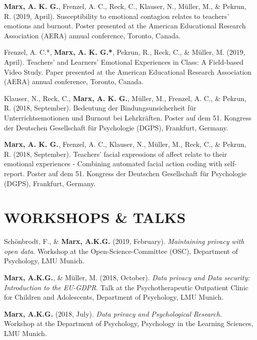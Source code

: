 \documentclass[letterpaper]{article}
\renewenvironment{itemize}{ %
  \begin{list}{}{ %
    \setlength{\leftmargin}{2.5em} %
  }
}{
  \end{list}
}
\begin{document}
\begin{itemize}
\item {\bf Marx, A. K. G.}, Frenzel, A. C., Reck, C., Klauser, N., Müller, M., \& Pekrun, R. (2019, April). Susceptibility to emotional contagion relates to teachers' emotions and burnout. Poster presented at the American Educational Research Association (AERA) annual conference, Toronto, Canada.
\item Frenzel, A. C.*, {\bf Marx, A. K. G.*}, Pekrun, R., Reck, C., \& Müller, M. (2019, April). Teachers’ and Learners’ Emotional Experiences in Class: A Field-based Video Study. Paper presented at the American Educational Research Association (AERA) annual conference, Toronto, Canada.
\item Klauser, N., Reck, C., {\bf Marx, A. K. G.}, Müller, M., Frenzel, A. C., \& Pekrun, R. (2018, September). Bedeutung der Bindungsunsicherheit für Unterrichtsemotionen und Burnout bei Lehrkräften. Poster auf dem 51. Kongress der Deutschen Gesellschaft für Psychologie (DGPS), Frankfurt, Germany.
\item {\bf Marx, A. K. G.}, Frenzel, A. C., Klauser, N., Müller, M., Reck, C., \& Pekrun, R. (2018, September). Teachers' facial expressions of affect relate to their emotional experiences - Combining automated facial action coding with self-report. Poster auf dem 51. Kongress der Deutschen Gesellschaft für Psychologie (DGPS), Frankfurt, Germany.
\item{}
\end{itemize}


\section*{WORKSHOPS \& TALKS}
\begin{itemize}
\item Schönbrodt, F., \& {\bf Marx, A.K.G.} (2019, February). {\it Maintaining privacy with open data}. Workshop at the Open-Science-Committee (OSC), Department of Psychology, LMU Munich.
\item {\bf Marx, A.K.G.}, \& Müller, M. (2018, October). {\it Data privacy and Data security: Introduction to the EU-GDPR}. Talk at the Psychotherapeutic Outpatient Clinic for Children and Adolescents, Department of Psychology, LMU Munich.
\item {\bf Marx, A.K.G.} (2018, July). {\it Data privacy and Psychological Research}. Workshop at the Department of Psychology, Psychology in the Learning Sciences, LMU Munich.
\end{itemize}
\end{document}
